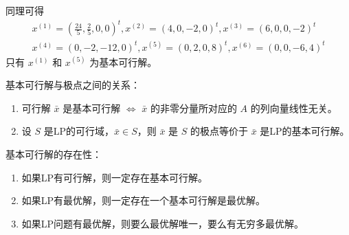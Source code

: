 \begin{example}
    同理可得
    \begin{gather*}
        x^{(1)} = (\frac{24}{5}, \frac{2}{5}, 0, 0)^t, x^{(2)} = (4, 0, -2, 0)^t, x^{(3)} = (6, 0, 0, -2)^t\\
        x^{(4)} = (0, -2, -12, 0)^t, x^{(5)} = (0, 2, 0, 8)^t, x^{(6)} = (0, 0, -6, 4)^t
    \end{gather*}
    只有 $x^{(1)}$ 和 $x^{(5)}$ 为基本可行解。
\end{example}

\begin{theorem}
    基本可行解与极点之间的关系：
    \begin{enumerate}
        \item 可行解 $\bar{x}$ 是基本可行解 $\Longleftrightarrow$ $\bar{x}$ 的非零分量所对应的 $A$ 的列向量线性无关。
        \item 设 $S$ 是LP的可行域，$\bar{x} \in S$，则 $\bar{x}$ 是 $S$ 的极点等价于 $\bar{x}$ 是LP的基本可行解。
    \end{enumerate}
\end{theorem}

\begin{theorem}
    基本可行解的存在性：
    \begin{enumerate}
        \item 如果LP有可行解，则一定存在基本可行解。
        \item 如果LP有最优解，则一定存在一个基本可行解是最优解。
        \item 如果LP问题有最优解，则要么最优解唯一，要么有无穷多最优解。
    \end{enumerate}
\end{theorem}